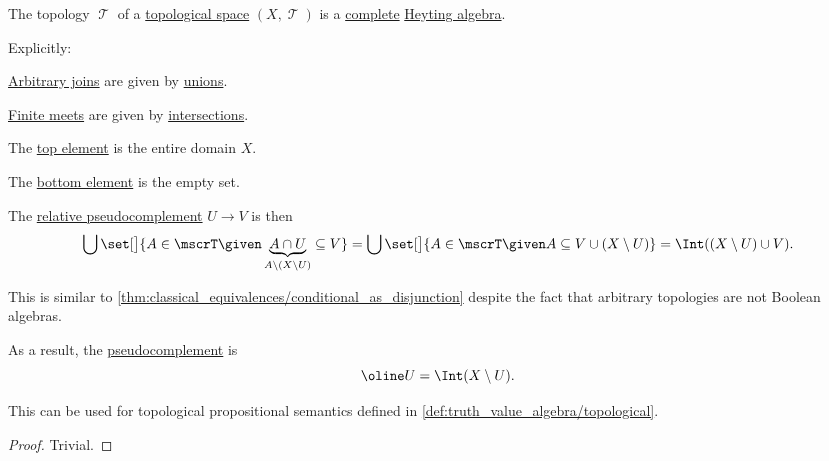\begin{proposition}\label{thm:topology_is_heyting_algebra}
  The topology \( \mscrT \) of a \hyperref[def:topological_space]{topological space} \( (X, \mscrT) \) is a \hyperref[def:complete_lattice]{complete} \hyperref[def:heyting_algebra]{Heyting algebra}.

  Explicitly:
  \begin{thmenum}
     \hyperref[def:lattice]{Arbitrary joins} are given by \hyperref[def:set_union]{unions}.

     \hyperref[def:lattice]{Finite meets} are given by \hyperref[def:set_intersection]{intersections}.

     The \hyperref[def:extremal_points/top_and_bottom]{top element} is the entire domain \( X \).

     The \hyperref[def:extremal_points/top_and_bottom]{bottom element} is the empty set.

     The \hyperref[def:heyting_algebra]{relative pseudocomplement} \( U \rightarrow V \) is then
    \begin{equation*}
      \bigcup\set[\big]{ A \in \mscrT \given \underbrace{A \cap U}_{A \setminus (X \setminus U)} \subseteq V }
      =
      \bigcup\set[\big]{ A \in \mscrT \given A \subseteq V \cup (X \setminus U) }
      =
      \Int((X \setminus U) \cup V).
    \end{equation*}

    This is similar to \cref{thm:classical_equivalences/conditional_as_disjunction} despite the fact that arbitrary topologies are not Boolean algebras.

     As a result, the \hyperref[def:heyting_algebra/pseudocomplement]{pseudocomplement} is
    \begin{equation*}
      \oline U = \Int(X \setminus U).
    \end{equation*}
  \end{thmenum}
\end{proposition}
\begin{comments}
  \item This can be used for topological propositional semantics defined in \cref{def:truth_value_algebra/topological}.
\end{comments}
\begin{proof}
  Trivial.
\end{proof}

